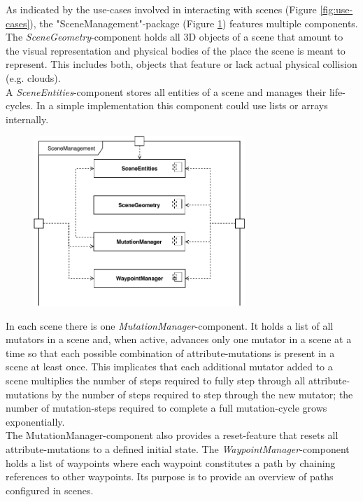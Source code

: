 As indicated by the use-cases involved in interacting with scenes (Figure \ref{fig:use-cases}), the "SceneManagement"-package (Figure \ref{fig:component-diagram-scenemanagement}) features multiple components.\\
The \emph{SceneGeometry}-component holds all 3D objects of a scene that amount to the visual representation and physical bodies of the place the scene is meant to represent. This includes both, objects that feature or lack actual physical collision (e.g. clouds).\\
A \emph{SceneEntities}-component stores all entities of a scene and manages their life-cycles. In a simple implementation this component could use lists or arrays internally.
\begin{figure}[hb!]
    \centering
    \includegraphics[width=8cm]{tex/img/ch04/ComponentDiagram_SceneManagement.pdf}
    \label{fig:component-diagram-scenemanagement}
\end{figure}
In each scene there is one \emph{MutationManager}-component. It holds a list of all mutators in a scene and, when active, advances only one mutator in a scene at a time so that each possible combination of attribute-mutations is present in a scene at least once. This implicates that each additional mutator added to a scene multiplies the number of steps required to fully step through all attribute-mutations by the number of steps required to step through the new mutator; the number of mutation-steps required to complete a full mutation-cycle grows exponentially.\\
The MutationManager-component also provides a reset-feature that resets all attribute-mutations to a defined initial state.
The \emph{WaypointManager}-component holds a list of waypoints where each waypoint constitutes a path by chaining references to other waypoints. Its purpose is to provide an overview of paths configured in scenes.
%
